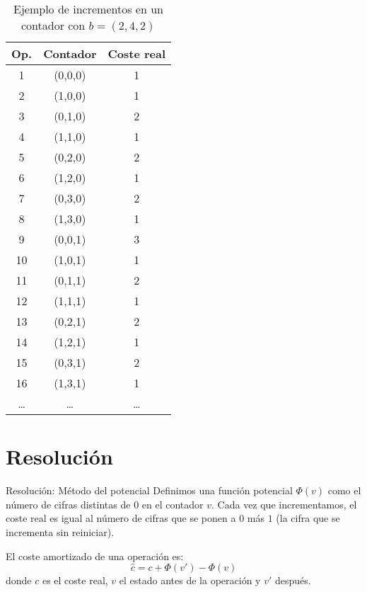 \documentclass[aspectratio=169]{beamer}
\begin{document}
\begin{frame}{}
    \begin{table}
        \centering
        {\small
        \begin{tabular}{|c|c|c|}
            \hline
            	\textbf{Op.} & \textbf{Contador} & \textbf{Coste real} \\
            \hline
            1 & (0,0,0) & 1 \\
            2 & (1,0,0) & 1 \\
            3 & (0,1,0) & 2 \\
            4 & (1,1,0) & 1 \\
            5 & (0,2,0) & 2 \\
            6 & (1,2,0) & 1 \\
            7 & (0,3,0) & 2 \\
            8 & (1,3,0) & 1 \\
            9 & (0,0,1) & 3 \\
            10 & (1,0,1) & 1 \\
            11 & (0,1,1) & 2 \\
            12 & (1,1,1) & 1 \\
            13 & (0,2,1) & 2 \\
            14 & (1,2,1) & 1 \\
            15 & (0,3,1) & 2 \\
            16 & (1,3,1) & 1 \\
            \ldots & \ldots & \ldots \\
            \hline
        \end{tabular}
        }
        \caption{Ejemplo de incrementos en un contador con $b = (2,4,2)$}
    \end{table}
\end{frame}

\section{Resolución}

\begin{frame}{Resolución: Método del potencial}
    Definimos una función potencial $\Phi(v)$ como el número de cifras distintas de $0$ en el contador $v$. Cada vez que incrementamos, el coste real es igual al número de cifras que se ponen a $0$ más $1$ (la cifra que se incrementa sin reiniciar).
    
    El coste amortizado de una operación es:
    \[
    \hat{c} = c + \Phi(v') - \Phi(v)
    \]
    donde $c$ es el coste real, $v$ el estado antes de la operación y $v'$ después.
\end{frame}
\end{document}
